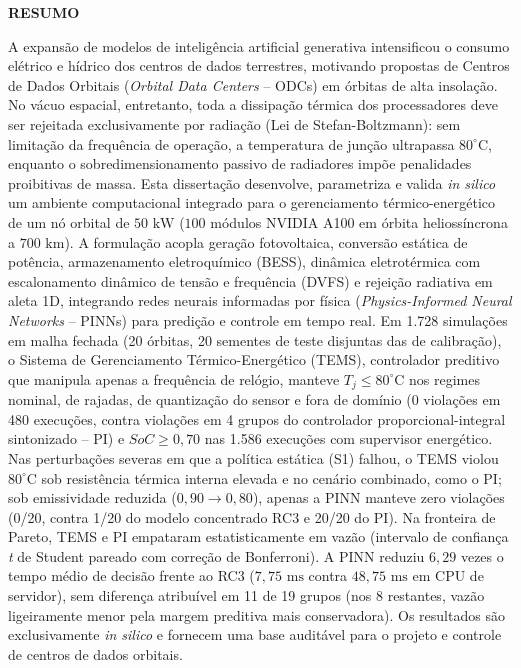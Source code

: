 \newpage
\begin{center}
    \textbf{RESUMO}
\end{center}
\vspace{0.3cm}

\noindent A expansão de modelos de inteligência artificial generativa intensificou o consumo elétrico e hídrico dos centros de dados terrestres, motivando propostas de Centros de Dados Orbitais (\textit{Orbital Data Centers} -- ODCs) em órbitas de alta insolação. No vácuo espacial, entretanto, toda a dissipação térmica dos processadores deve ser rejeitada exclusivamente por radiação (Lei de Stefan-Boltzmann): sem limitação da frequência de operação, a temperatura de junção ultrapassa $80^\circ\text{C}$, enquanto o sobredimensionamento passivo de radiadores impõe penalidades proibitivas de massa. Esta dissertação desenvolve, parametriza e valida \textit{in silico} um ambiente computacional integrado para o gerenciamento térmico-energético de um nó orbital de $50\text{ kW}$ ($100$ módulos NVIDIA A100 em órbita heliossíncrona a $700\text{ km}$). A formulação acopla geração fotovoltaica, conversão estática de potência, armazenamento eletroquímico (BESS), dinâmica eletrotérmica com escalonamento dinâmico de tensão e frequência (DVFS) e rejeição radiativa em aleta 1D, integrando redes neurais informadas por física (\textit{Physics-Informed Neural Networks} -- PINNs) para predição e controle em tempo real. Em 1.728 simulações em malha fechada (20 órbitas, 20 sementes de teste disjuntas das de calibração), o Sistema de Gerenciamento Térmico-Energético (TEMS), controlador preditivo que manipula apenas a frequência de relógio, manteve $T_j \le 80^\circ\text{C}$ nos regimes nominal, de rajadas, de quantização do sensor e fora de domínio (0 violações em 480 execuções, contra violações em 4 grupos do controlador proporcional-integral sintonizado -- PI) e $SoC \ge 0{,}70$ nas 1.586 execuções com supervisor energético. Nas perturbações severas em que a política estática (S1) falhou, o TEMS violou $80^\circ\text{C}$ sob resistência térmica interna elevada e no cenário combinado, como o PI; sob emissividade reduzida ($0{,}90 \to 0{,}80$), apenas a PINN manteve zero violações (0/20, contra 1/20 do modelo concentrado RC3 e 20/20 do PI). Na fronteira de Pareto, TEMS e PI empataram estatisticamente em vazão (intervalo de confiança \textit{t} de Student pareado com correção de Bonferroni). A PINN reduziu $6{,}29$ vezes o tempo médio de decisão frente ao RC3 ($7{,}75\text{ ms}$ contra $48{,}75\text{ ms}$ em CPU de servidor), sem diferença atribuível em 11 de 19 grupos (nos 8 restantes, vazão ligeiramente menor pela margem preditiva mais conservadora). Os resultados são exclusivamente \textit{in silico} e fornecem uma base auditável para o projeto e controle de centros de dados orbitais.

